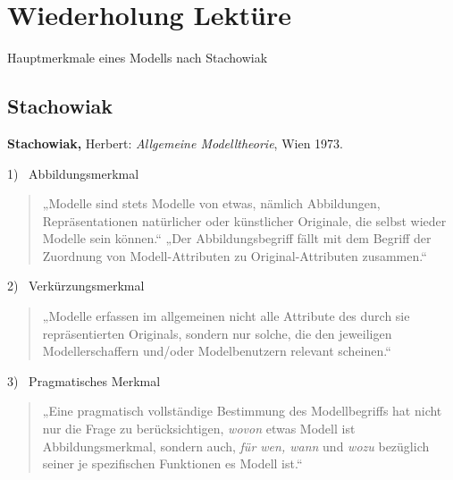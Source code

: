 
\section{Wiederholung Lektüre}

\begin{frame}{Hauptmerkmale eines Modells nach Stachowiak}
\subsection{Stachowiak}
\textbf{Stachowiak,} Herbert: \emph{Allgemeine Modelltheorie}, Wien 1973.   
\begin{alertblock}{1)~ Abbildungsmerkmal}
\begin{quote} \scriptsize
    „Modelle sind stets Modelle von etwas, nämlich Abbildungen, Repräsentationen natürlicher oder künstlicher Originale, die selbst wieder Modelle sein können.“ 
    „Der Abbildungsbegriff fällt mit dem Begriff der Zuordnung von Modell-Attributen zu Original-Attributen zusammen.“ \parencite[131--132]{stachowiak} %
\end{quote}
\end{alertblock}
\begin{alertblock}{2)~ Verkürzungsmerkmal}
\begin{quote} \scriptsize
    „Modelle erfassen im allgemeinen nicht alle Attribute des durch sie repräsentierten Originals, sondern nur solche, die den jeweiligen Modellerschaffern und/oder Modelbenutzern relevant scheinen.“ \parencite[132]{stachowiak}
\end{quote}
\end{alertblock}
\begin{alertblock}{3)~ Pragmatisches Merkmal}
\begin{quote} \scriptsize
    „Eine pragmatisch vollständige Bestimmung des Modellbegriffs hat nicht nur die Frage zu berücksichtigen, \emph{wovon} etwas Modell ist \lbrack{}Abbildungsmerkmal\rbrack{}, sondern auch, \emph{für wen, wann} und \emph{wozu} bezüglich seiner je spezifischen Funktionen es Modell ist.“ \parencite[132]{stachowiak} %
\end{quote}
\end{alertblock}

\end{frame}


